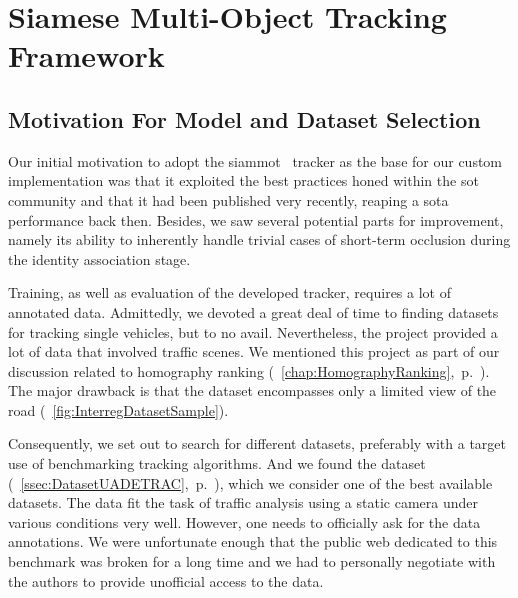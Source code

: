 \section{Siamese Multi-Object Tracking Framework}
\label{sec:SiamMOT}

\subsection{Motivation For Model and Dataset Selection}

Our initial motivation to adopt the \gls{siammot}~\cite{shuai2021siammot} tracker as the base for our custom implementation was that it exploited the best practices honed within the \gls{sot} community and that it had been published very recently, reaping a \gls{sota} performance back then. Besides, we saw several potential parts for improvement, namely its ability to inherently handle trivial cases of short-term occlusion during the identity association stage.

Training, as well as evaluation of the developed tracker, requires a lot of annotated data. Admittedly, we devoted a great deal of time to finding datasets for tracking single vehicles, but to no avail. Nevertheless, the \interreg{} project provided a lot of data that involved traffic scenes. We mentioned this project as part of our discussion related to homography ranking (\chaptertext{}~\ref{chap:HomographyRanking},~p.~\pageref{chap:HomographyRanking}). The major drawback is that the dataset encompasses only a limited view of the road (\figtext{}~\ref{fig:InterregDatasetSample}).

Consequently, we set out to search for different datasets, preferably with a target use of benchmarking tracking algorithms. And we found the \uadetrac{} dataset (\sectiontext{}~\ref{ssec:DatasetUADETRAC},~p.~\pageref{ssec:DatasetUADETRAC}), which we consider one of the best available datasets. The data fit the task of traffic analysis using a static camera under various conditions very well. However, one needs to officially ask for the data annotations. We were unfortunate enough that the public web dedicated to this benchmark was broken for a long time and we had to personally negotiate with the authors to provide unofficial access to the data.

